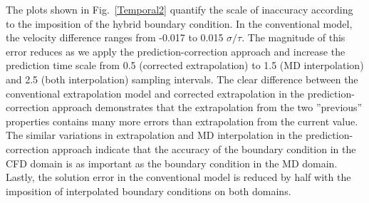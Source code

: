 \documentclass[preprint,12pt]{elsarticle}
\begin{document}

The plots shown in Fig.~\ref{Temporal2} quantify the scale of inaccuracy according to the imposition of the hybrid boundary condition. In the conventional model, the velocity difference ranges from -0.017 to 0.015 $\sigma/\tau$. The magnitude of this error reduces as we apply the prediction-correction approach and increase the prediction time scale from 0.5 (corrected extrapolation) to 1.5 (MD interpolation) and 2.5 (both interpolation) sampling intervals. The clear difference between the conventional extrapolation model and corrected extrapolation in the prediction-correction approach demonstrates that the extrapolation from the two ''previous'' properties contains many more errors than extrapolation from the current value. The similar variations in extrapolation and MD interpolation in the prediction-correction approach indicate that the accuracy of the boundary condition in the CFD domain is as important as the boundary condition in the MD domain. Lastly, the solution error in the conventional model is reduced by half with the imposition of interpolated boundary conditions on both domains. 
\end{document}
